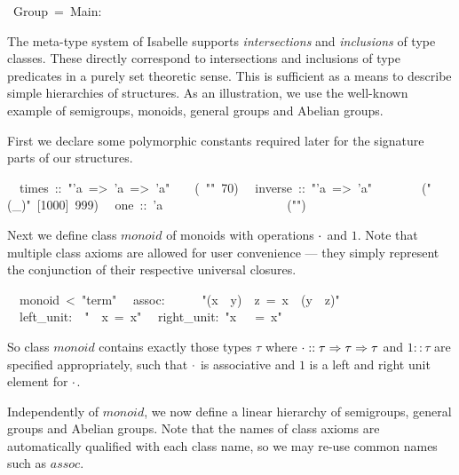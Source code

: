 \begin{isabelle}%
%
~Group~=~Main:%
\begin{isamarkuptext}%
\medskip\noindent The meta-type system of Isabelle supports
 \emph{intersections} and \emph{inclusions} of type classes. These
 directly correspond to intersections and inclusions of type
 predicates in a purely set theoretic sense. This is sufficient as a
 means to describe simple hierarchies of structures.  As an
 illustration, we use the well-known example of semigroups, monoids,
 general groups and Abelian groups.%
\end{isamarkuptext}%
%
%
\begin{isamarkuptext}%
First we declare some polymorphic constants required later for the
 signature parts of our structures.%
\end{isamarkuptext}%
\isanewline
~~times~::~{"}'a~=>~'a~=>~'a{"}~~~~(~{"}{\isasymOtimes}{"}~70)\isanewline
~~inverse~::~{"}'a~=>~'a{"}~~~~~~~~({"}(\_{\isasyminv}){"}~[1000]~999)\isanewline
~~one~::~'a~~~~~~~~~~~~~~~~~~~~({"}{\isasymunit}{"})%
\begin{isamarkuptext}%
\noindent Next we define class $monoid$ of monoids with operations
 $\cdot$ and $1$.  Note that multiple class axioms are allowed for
 user convenience --- they simply represent the conjunction of their
 respective universal closures.%
\end{isamarkuptext}%
\isanewline
~~monoid~<~{"}term{"}\isanewline
~~assoc:~~~~~~{"}(x~{\isasymOtimes}~y)~{\isasymOtimes}~z~=~x~{\isasymOtimes}~(y~{\isasymOtimes}~z){"}\isanewline
~~left\_unit:~~{"}{\isasymunit}~{\isasymOtimes}~x~=~x{"}\isanewline
~~right\_unit:~{"}x~{\isasymOtimes}~{\isasymunit}~=~x{"}%
\begin{isamarkuptext}%
\noindent So class $monoid$ contains exactly those types $\tau$ where
 $\cdot :: \tau \Rightarrow \tau \Rightarrow \tau$ and $1 :: \tau$ are specified
 appropriately, such that $\cdot$ is associative and $1$ is a left
 and right unit element for $\cdot$.%
\end{isamarkuptext}%
%
\begin{isamarkuptext}%
\medskip Independently of $monoid$, we now define a linear hierarchy
 of semigroups, general groups and Abelian groups.  Note that the
 names of class axioms are automatically qualified with each class
 name, so we may re-use common names such as $assoc$.%
\end{isamarkuptext}%

\end{isabelle}
